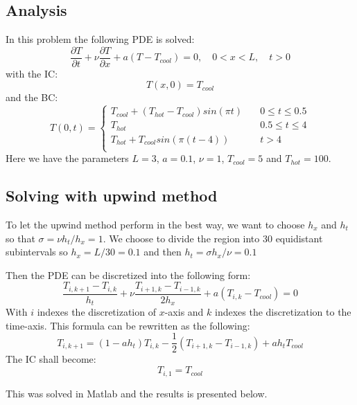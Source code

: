 \documentclass[11pt,a4paper,roman]{scrartcl}
\begin{document}
\subsection*{Analysis}
In this problem the following PDE is solved:
\begin{equation}
\frac{\partial T}{\partial t} + \nu\frac{\partial T}{\partial x}+a(T-T_{cool}) = 0, \quad 0<x<L, \quad t>0
\end{equation}
with the IC: 
\begin{equation}
T(x,0)=T_{cool}
\end{equation}
and the BC:
\begin{equation}
T(0,t) = 
\begin{cases}
T_{cool} + (T_{hot}-T_{cool})sin(\pi t) \quad & 0\leq t \leq 0.5 \\
T_{hot}	\quad & 0.5 \leq t \leq 4 \\
T_{hot} + T_{cool} sin(\pi(t-4)) \quad & t>4\\
\end{cases}
\end{equation}
Here we have the parameters $L=3$, $a=0.1$, $\nu=1$, $T_{cool}=5$ and $T_{hot} = 100$.

\subsection*{Solving with upwind method}
To let the upwind method perform in the best way, we want to choose $h_x$ and $h_t$ so that $\sigma = \nu h_t/h_x=1$. We choose to divide the region into 30 equidistant subintervals so $h_x=L/30=0.1$ and then $h_t = \sigma h_x /\nu =0.1$

Then the PDE can be discretized into the following form: 
\begin{equation}
\frac{T_{i,k+1}-T_{i,k}}{h_t}+\nu\frac{T_{i+1,k}-T_{i-1,k}}{2h_x} + a(T_{i,k}-T_{cool}) = 0
\end{equation}
With $i$ indexes the discretization of $x$-axis and $k$ indexes the discretization to the time-axis. This formula can be rewritten as the following: 
\begin{equation}
T_{i,k+1} = (1-ah_t)T_{i,k}-\frac{1}{2}(T_{i+1,k}-T_{i-1,k})+ah_tT_{cool}
\end{equation}
The IC shall become: 
\begin{equation}
T_{i,1} = T_{cool} 
\end{equation}

This was solved in Matlab and the results is presented below.
\end{document}
